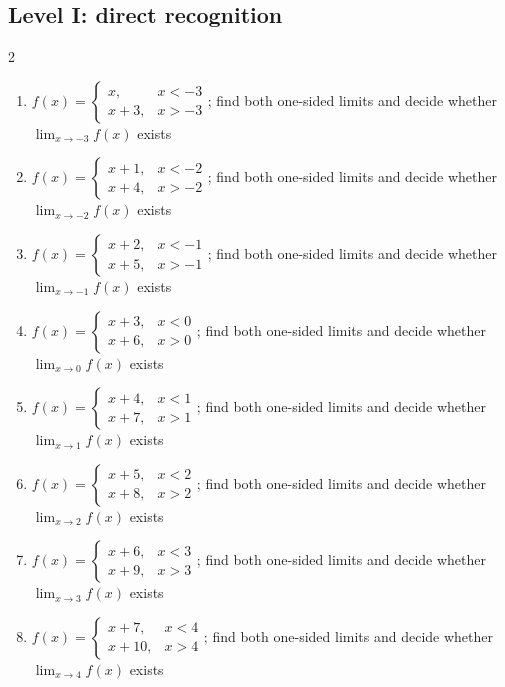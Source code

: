 \documentclass[11pt,oneside]{book}
\begin{document}
\subsection*{Level I: direct recognition}
\begin{multicols}{2}
\begin{enumerate}[leftmargin=*,label=\textbf{\arabic*.},itemsep=0.65\baselineskip]
\item $f(x)=\begin{cases} x, & x<-3\\ x + 3, & x>-3 \end{cases}$; find both one-sided limits and decide whether $\lim_{x\to -3}f(x)$ exists
\item $f(x)=\begin{cases} x + 1, & x<-2\\ x + 4, & x>-2 \end{cases}$; find both one-sided limits and decide whether $\lim_{x\to -2}f(x)$ exists
\item $f(x)=\begin{cases} x + 2, & x<-1\\ x + 5, & x>-1 \end{cases}$; find both one-sided limits and decide whether $\lim_{x\to -1}f(x)$ exists
\item $f(x)=\begin{cases} x + 3, & x<0\\ x + 6, & x>0 \end{cases}$; find both one-sided limits and decide whether $\lim_{x\to 0}f(x)$ exists
\item $f(x)=\begin{cases} x + 4, & x<1\\ x + 7, & x>1 \end{cases}$; find both one-sided limits and decide whether $\lim_{x\to 1}f(x)$ exists
\item $f(x)=\begin{cases} x + 5, & x<2\\ x + 8, & x>2 \end{cases}$; find both one-sided limits and decide whether $\lim_{x\to 2}f(x)$ exists
\item $f(x)=\begin{cases} x + 6, & x<3\\ x + 9, & x>3 \end{cases}$; find both one-sided limits and decide whether $\lim_{x\to 3}f(x)$ exists
\item $f(x)=\begin{cases} x + 7, & x<4\\ x + 10, & x>4 \end{cases}$; find both one-sided limits and decide whether $\lim_{x\to 4}f(x)$ exists

\end{enumerate}
\end{multicols}
\end{document}
